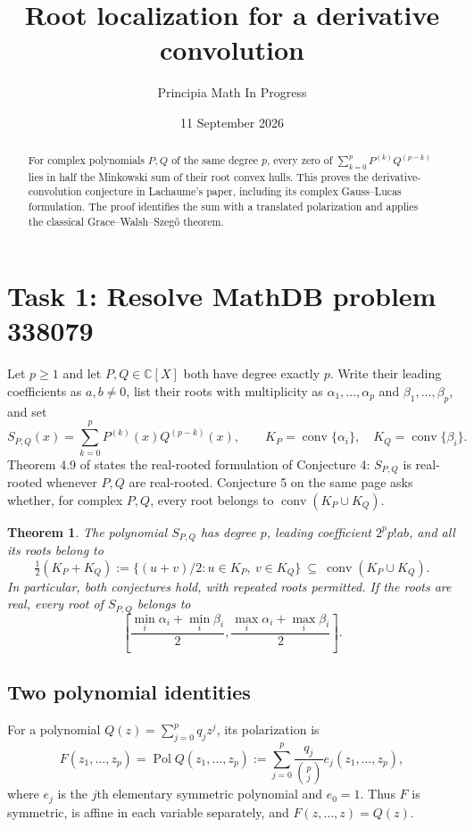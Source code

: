 \documentclass[11pt]{article}
\title{Root localization for a derivative convolution}
\author{Principia Math In Progress}
\date{11 September 2026}
\newtheorem{theorem}{Theorem}
\newcommand{\conv}{\operatorname{conv}}
\newcommand{\Pol}{\operatorname{Pol}}
\begin{document}
\maketitle
\begin{abstract}
For complex polynomials $P,Q$ of the same degree $p$, every zero of
$\sum_{k=0}^p P^{(k)}Q^{(p-k)}$ lies in half the Minkowski sum of their
root convex hulls. This proves the derivative-convolution conjecture in
Lachaume's paper, including its complex Gauss--Lucas formulation.
The proof identifies the sum with a translated polarization and applies
the classical Grace--Walsh--Szeg\H{o} theorem.
\end{abstract}

\section*{Task 1: Resolve MathDB problem 338079}
Let $p\geq1$ and let $P,Q\in\mathbb C[X]$ both have degree exactly $p$.
Write their leading coefficients as $a,b\ne0$, list their roots with
multiplicity as $\alpha_1,\ldots,\alpha_p$ and $\beta_1,\ldots,\beta_p$,
and set
\[
 S_{P,Q}(x)=\sum_{k=0}^pP^{(k)}(x)Q^{(p-k)}(x),\qquad
 K_P=\conv\{\alpha_i\},\quad K_Q=\conv\{\beta_i\}.
\]
Theorem 4.9 of \cite{lachaume} states the real-rooted formulation of
Conjecture 4: $S_{P,Q}$ is real-rooted whenever $P,Q$ are real-rooted.
Conjecture 5 on the same page asks whether, for complex $P,Q$, every root
belongs to $\conv(K_P\cup K_Q)$.

\begin{theorem}\label{thm:main}
The polynomial $S_{P,Q}$ has degree $p$, leading coefficient $2^pp!ab$,
and all its roots belong to
\[
 \tfrac12(K_P+K_Q)
 :=\{(u+v)/2:u\in K_P,\ v\in K_Q\}
 \ \subseteq\ \conv(K_P\cup K_Q).
\]
In particular, both conjectures hold, with repeated roots permitted.
If the roots are real, every root of $S_{P,Q}$ belongs to
\[
 \left[\frac{\min_i\alpha_i+\min_i\beta_i}{2},
       \frac{\max_i\alpha_i+\max_i\beta_i}{2}\right].
\]
\end{theorem}

\subsection*{Two polynomial identities}
For a polynomial $Q(z)=\sum_{j=0}^p q_jz^j$, its polarization is
\[
 F(z_1,\ldots,z_p)=\Pol Q(z_1,\ldots,z_p)
   :=\sum_{j=0}^p\frac{q_j}{\binom pj}e_j(z_1,\ldots,z_p),
\]
where $e_j$ is the $j$th elementary symmetric polynomial and $e_0=1$.
Thus $F$ is symmetric, is affine in each variable separately, and
$F(z,\ldots,z)=Q(z)$.
\end{document}
